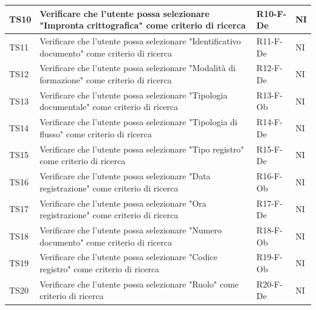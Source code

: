 \documentclass[a4paper,12pt]{article}
\begin{document}
\begin{longtable}{|M{1.2cm}|M{6.3cm}|M{2.5cm}|M{1.5cm}|}
                TS10 & Verificare che l'utente possa selezionare "Impronta crittografica" come criterio di ricerca & R10-F-De & NI \\
                \hline

                TS11 & Verificare che l'utente possa selezionare "Identificativo documento" come criterio di ricerca & R11-F-De & NI \\
                \hline

                TS12 & Verificare che l'utente possa selezionare "Modalità di formazione" come criterio di ricerca & R12-F-De & NI \\
                \hline

                TS13 & Verificare che l'utente possa selezionare "Tipologia documentale" come criterio di ricerca & R13-F-Ob & NI \\
                \hline

                TS14 & Verificare che l'utente possa selezionare "Tipologia di flusso" come criterio di ricerca & R14-F-De & NI \\
                \hline

                TS15 & Verificare che l'utente possa selezionare "Tipo registro" come criterio di ricerca & R15-F-De & NI \\
                \hline
               
                TS16 & Verificare che l'utente possa selezionare "Data registrazione" come criterio di ricerca & R16-F-Ob & NI \\
                \hline
                
                TS17 & Verificare che l'utente possa selezionare "Ora registrazione" come criterio di ricerca & R17-F-De & NI \\
                \hline
                
                TS18 & Verificare che l'utente possa selezionare "Numero documento" come criterio di ricerca & R18-F-Ob & NI \\
                \hline

                TS19 & Verificare che l'utente possa selezionare "Codice registro" come criterio di ricerca & R19-F-Ob & NI \\
                \hline
                
                TS20 & Verificare che l'utente possa selezionare "Ruolo" come criterio di ricerca & R20-F-De & NI \\
                \hline
                

\end{longtable}
\end{document}
